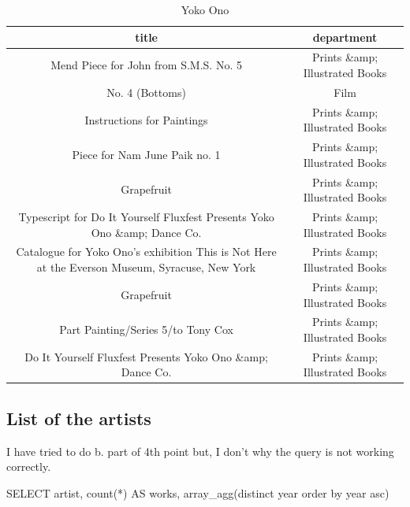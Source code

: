 \documentclass[journal,transmag]{IEEEtran}
\begin{document}
\begin{table}[]
\centering
\caption{Yoko Ono}
\label{yoko}
\begin{tabular}{c|c}
title                                                                                          & department                      \\ \hline
Mend Piece for John from S.M.S. No. 5                                                          & Prints \&amp; Illustrated Books \\
No. 4 (Bottoms)                                                                                & Film                            \\
Instructions for Paintings                                                                     & Prints \&amp; Illustrated Books \\
Piece for Nam June Paik no. 1                                                                  & Prints \&amp; Illustrated Books \\
Grapefruit                                                                                     & Prints \&amp; Illustrated Books \\
Typescript for Do It Yourself Fluxfest Presents Yoko Ono \&amp; Dance Co.                      & Prints \&amp; Illustrated Books \\
Catalogue for Yoko Ono's exhibition This is Not Here at the Everson Museum, Syracuse, New York & Prints \&amp; Illustrated Books \\
Grapefruit                                                                                     & Prints \&amp; Illustrated Books \\
Part Painting/Series 5/to Tony Cox                                                             & Prints \&amp; Illustrated Books \\
Do It Yourself Fluxfest Presents Yoko Ono \&amp; Dance Co.                                     & Prints \&amp; Illustrated Books
\end{tabular}
\end{table}

\subsection{List of the artists}

I have tried to do b. part of 4th point but, I don't why the query is not working correctly.
\newline

SELECT  artist, count(*) AS works, array\_agg(distinct year order by year asc)
\end{document}
